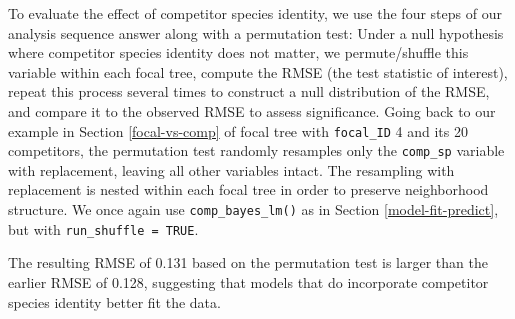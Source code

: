 \documentclass[12pt]{article}
\newenvironment{Shaded}{\begin{snugshade}}{\end{snugshade}}
\newcommand{\CommentTok}[1]{\textcolor[rgb]{0.56,0.35,0.01}{\textit{#1}}}
\newcommand{\DataTypeTok}[1]{\textcolor[rgb]{0.13,0.29,0.53}{#1}}
\newcommand{\KeywordTok}[1]{\textcolor[rgb]{0.13,0.29,0.53}{\textbf{#1}}}
\newcommand{\NormalTok}[1]{#1}
\newcommand{\OperatorTok}[1]{\textcolor[rgb]{0.81,0.36,0.00}{\textbf{#1}}}
\newcommand{\OtherTok}[1]{\textcolor[rgb]{0.56,0.35,0.01}{#1}}
\newcommand{\StringTok}[1]{\textcolor[rgb]{0.31,0.60,0.02}{#1}}
\begin{document}
To evaluate the effect of competitor species identity, we use the four
steps of our analysis sequence answer along with a permutation test:
Under a null hypothesis where competitor species identity does not
matter, we permute/shuffle this variable within each focal tree, compute
the RMSE (the test statistic of interest), repeat this process several
times to construct a null distribution of the RMSE, and compare it to
the observed RMSE to assess significance. Going back to our example in
Section \ref{focal-vs-comp} of focal tree with \texttt{focal\_ID} 4 and
its 20 competitors, the permutation test randomly resamples only the
\texttt{comp\_sp} variable with replacement, leaving all other variables
intact. The resampling with replacement is nested within each focal tree
in order to preserve neighborhood structure. We once again use
\texttt{comp\_bayes\_lm()} as in Section \ref{model-fit-predict}, but
with \texttt{run\_shuffle\ =\ TRUE}.

\begin{Shaded}
\end{Shaded}

\begin{Shaded}
\end{Shaded}

The resulting RMSE of 0.131 based on the permutation test is larger than
the earlier RMSE of 0.128, suggesting that models that do incorporate
competitor species identity better fit the data.
\end{document}
